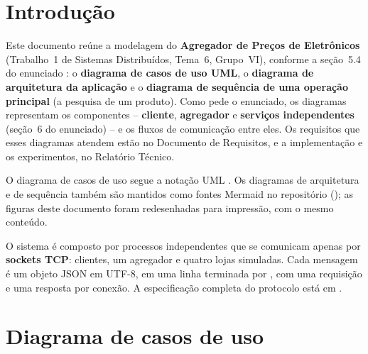 

\preambulo{\naturezatrabalho}


\frenchspacing

\pretextual
\capagrupo
\folhaderostogrupo
\listafiguras
\listaquadros
\sumario

\textual

\chapter{Introdução}

Este documento reúne a modelagem do \textbf{Agregador de Preços de Eletrônicos} (Trabalho~1 de Sistemas Distribuídos, Tema~6, Grupo~VI), conforme a seção~5.4 do enunciado \cite{enunciado2026}: o \textbf{diagrama de casos de uso UML}, o \textbf{diagrama de arquitetura da aplicação} e o \textbf{diagrama de sequência de uma operação principal} (a pesquisa de um produto). Como pede o enunciado, os diagramas representam os componentes -- \textbf{cliente}, \textbf{agregador} e \textbf{serviços independentes} (seção~6 do enunciado) -- e os fluxos de comunicação entre eles. Os requisitos que esses diagramas atendem estão no Documento de Requisitos, e a implementação e os experimentos, no Relatório Técnico.

O diagrama de casos de uso segue a notação UML \cite{sommerville2015}. Os diagramas de arquitetura e de sequência também são mantidos como fontes Mermaid no repositório (); as figuras deste documento foram redesenhadas para impressão, com o mesmo conteúdo.

O sistema é composto por processos independentes que se comunicam apenas por \textbf{sockets TCP}: clientes, um agregador e quatro lojas simuladas. Cada mensagem é um objeto JSON em UTF-8, em uma linha terminada por , com uma requisição e uma resposta por conexão. A especificação completa do protocolo está em .

\chapter{Diagrama de casos de uso}


